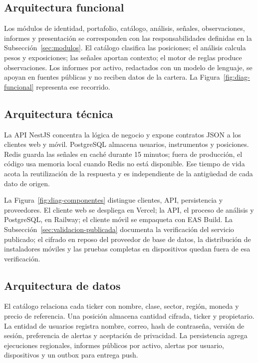 \subsection{Arquitectura funcional}\label{subsec:arq-funcional}

Los módulos de identidad, portafolio, catálogo, análisis, señales, observaciones, informes y presentación se corresponden con las responsabilidades definidas en la Subsección~\ref{sec:modulos}. El catálogo clasifica las posiciones; el análisis calcula pesos y exposiciones; las señales aportan contexto; el motor de reglas produce observaciones. Los informes por activo, redactados con un modelo de lenguaje, se apoyan en fuentes públicas y no reciben datos de la cartera. La Figura~\ref{fig:diag-funcional} representa ese recorrido.


\subsection{Arquitectura técnica}\label{subsec:arq-tecnica}

La API NestJS concentra la lógica de negocio y expone contratos JSON a los clientes web y móvil. PostgreSQL almacena usuarios, instrumentos y posiciones. Redis guarda las señales en caché durante 15 minutos; fuera de producción, el código usa memoria local cuando Redis no está disponible. Ese tiempo de vida acota la reutilización de la respuesta y es independiente de la antigüedad de cada dato de origen.

La Figura~\ref{fig:diag-componentes} distingue clientes, API, persistencia y proveedores. El cliente web se despliega en Vercel; la API, el proceso de análisis y PostgreSQL, en Railway; el cliente móvil se empaqueta con EAS Build. La Subsección~\ref{sec:validacion-publicada} documenta la verificación del servicio publicado; el cifrado en reposo del proveedor de base de datos, la distribución de instaladores móviles y las pruebas completas en dispositivos quedan fuera de esa verificación.


\subsection{Arquitectura de datos}\label{subsec:arq-datos}

El catálogo relaciona cada ticker con nombre, clase, sector, región, moneda y precio de referencia. Una posición almacena cantidad cifrada, ticker y propietario. La entidad de usuarios registra nombre, correo, hash de contraseña, versión de sesión, preferencia de alertas y aceptación de privacidad. La persistencia agrega ejecuciones regionales, informes públicos por activo, alertas por usuario, dispositivos y un outbox para entrega push.

